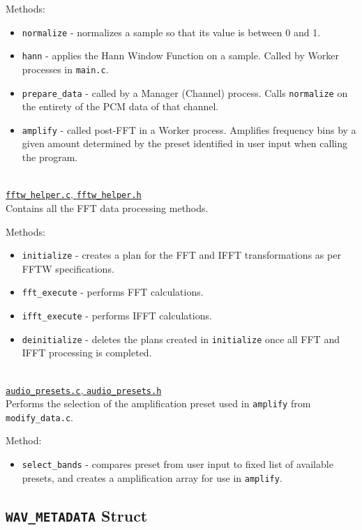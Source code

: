 \documentclass[11pt]{extarticle}
\begin{document}
Methods:
\begin{itemize}
    \item \texttt{normalize} - normalizes a sample so that its value is between 0 and 1.
    \item \texttt{hann} - applies the Hann Window Function on a sample. Called by Worker processes in \texttt{main.c}.
    \item \texttt{prepare\_data} - called by a Manager (Channel) process. Calls \texttt{normalize} on the entirety of the PCM data of that channel.
    \item \texttt{amplify} - called post-FFT in a Worker process. Amplifies frequency bins by a given amount determined by the preset identified in user input when calling the program. 
\end{itemize}\\

\underline{\texttt{fftw\_helper.c}, \texttt{fftw\_helper.h}}\\

Contains all the FFT data processing methods.

Methods:
\begin{itemize}
    \item \texttt{initialize} - creates a plan for the FFT and IFFT transformations as per FFTW specifications.
    \item \texttt{fft\_execute} - performs FFT calculations.
    \item \texttt{ifft\_execute} - performs IFFT calculations.
    \item \texttt{deinitialize} - deletes the plans created in \texttt{initialize} once all FFT and IFFT processing is completed.
\end{itemize}\\

\underline{\texttt{audio\_presets.c}, \texttt{audio\_presets.h}}\\

Performs the selection of the amplification preset used in \texttt{amplify} from \texttt{modify\_data.c}.

Method:
\begin{itemize}
    \item \texttt{select\_bands} - compares preset from user input to fixed list of available presets, and creates a amplification array for use in \texttt{amplify}.
\end{itemize}

\subsection{\texttt{WAV\_METADATA} Struct}
\end{document}
